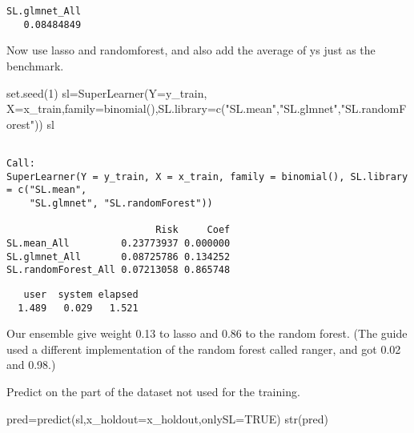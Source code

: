 \documentclass[
  letterpaper,
  DIV=11,
  numbers=noendperiod]{scrartcl}
\newenvironment{Shaded}{\begin{snugshade}}{\end{snugshade}}
\newcommand{\AttributeTok}[1]{\textcolor[rgb]{0.40,0.45,0.13}{#1}}
\newcommand{\ConstantTok}[1]{\textcolor[rgb]{0.56,0.35,0.01}{#1}}
\newcommand{\DecValTok}[1]{\textcolor[rgb]{0.68,0.00,0.00}{#1}}
\newcommand{\FunctionTok}[1]{\textcolor[rgb]{0.28,0.35,0.67}{#1}}
\newcommand{\NormalTok}[1]{\textcolor[rgb]{0.00,0.23,0.31}{#1}}
\newcommand{\OtherTok}[1]{\textcolor[rgb]{0.00,0.23,0.31}{#1}}
\newcommand{\SpecialCharTok}[1]{\textcolor[rgb]{0.37,0.37,0.37}{#1}}
\newcommand{\StringTok}[1]{\textcolor[rgb]{0.13,0.47,0.30}{#1}}
\begin{document}
\begin{verbatim}
SL.glmnet_All 
   0.08484849 
\end{verbatim}

Now use lasso and randomforest, and also add the average of ys just as
the benchmark.

\begin{Shaded}
\begin{Highlighting}[]
\FunctionTok{set.seed}\NormalTok{(}\DecValTok{1}\NormalTok{)}
\NormalTok{sl}\OtherTok{=}\FunctionTok{SuperLearner}\NormalTok{(}\AttributeTok{Y=}\NormalTok{y\_train, }\AttributeTok{X=}\NormalTok{x\_train,}\AttributeTok{family=}\FunctionTok{binomial}\NormalTok{(),}\AttributeTok{SL.library=}\FunctionTok{c}\NormalTok{(}\StringTok{"SL.mean"}\NormalTok{,}\StringTok{"SL.glmnet"}\NormalTok{,}\StringTok{"SL.randomForest"}\NormalTok{))}
\NormalTok{sl}
\end{Highlighting}
\end{Shaded}

\begin{verbatim}

Call:  
SuperLearner(Y = y_train, X = x_train, family = binomial(), SL.library = c("SL.mean",  
    "SL.glmnet", "SL.randomForest")) 

                          Risk     Coef
SL.mean_All         0.23773937 0.000000
SL.glmnet_All       0.08725786 0.134252
SL.randomForest_All 0.07213058 0.865748
\end{verbatim}

\begin{Shaded}
\end{Shaded}

\begin{verbatim}
   user  system elapsed 
  1.489   0.029   1.521 
\end{verbatim}

Our ensemble give weight 0.13 to lasso and 0.86 to the random forest.
(The guide used a different implementation of the random forest called
ranger, and got 0.02 and 0.98.)

Predict on the part of the dataset not used for the training.

\begin{Shaded}
\begin{Highlighting}[]
\NormalTok{pred}\OtherTok{=}\FunctionTok{predict}\NormalTok{(sl,}\AttributeTok{x\_holdout=}\NormalTok{x\_holdout,}\AttributeTok{onlySL=}\ConstantTok{TRUE}\NormalTok{)}
\FunctionTok{str}\NormalTok{(pred)}
\end{Highlighting}
\end{Shaded}
\end{document}
